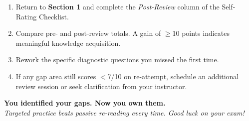 \documentclass[11pt,letterpaper]{article}
\begin{document}
\begin{planbox}
\vspace{0.4cm}

\begin{tcolorbox}[colback=blue!4!white,colframe=blue!60!black,title=\textbf{After Your Review Session},fonttitle=\bfseries,breakable]
\begin{enumerate}[leftmargin=1.5em]
  \item Return to \textbf{Section 1} and complete the \emph{Post-Review} column of the
        Self-Rating Checklist.
  \item Compare pre- and post-review totals.  A gain of $\geq$10 points indicates
        meaningful knowledge acquisition.
  \item Rework the specific diagnostic questions you missed the first time.
  \item If any gap area still scores $<$7/10 on re-attempt, schedule an additional
        review session or seek clarification from your instructor.
\end{enumerate}
\end{tcolorbox}

\end{planbox}

\vspace{1cm}

\begin{center}
\textbf{\Large You identified your gaps.  Now you own them.}\\[0.4cm]
\textit{Targeted practice beats passive re-reading every time.  Good luck on your exam!}
\end{center}
\end{document}
